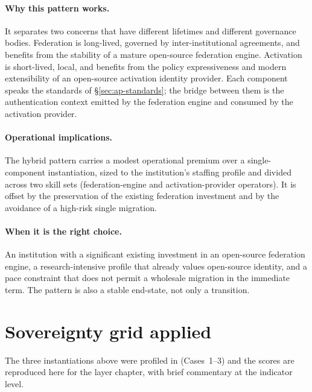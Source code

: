 \paragraph{Why this pattern works.} It separates two concerns that
have different lifetimes and different governance bodies. Federation
is long-lived, governed by inter-institutional agreements, and
benefits from the stability of a mature open-source federation engine.
Activation is short-lived,
local, and benefits from the policy expressiveness and modern
extensibility of an open-source activation identity provider. Each
component speaks the standards of
\S\ref{sec:ap-standards}; the bridge between them is the authentication context emitted
by the federation engine and consumed by the activation provider.

\paragraph{Operational implications.} The hybrid pattern carries a
modest operational premium over a
single-component instantiation, sized to the institution's staffing
profile and divided across two skill sets
(federation-engine and activation-provider operators). It is offset by
the preservation
of the existing federation investment and by the avoidance of a
high-risk single migration.

\paragraph{When it is the right choice.} An institution with a
significant existing investment in an open-source federation engine, a
research-intensive profile that already values open-source identity,
and a pace constraint that does not permit a wholesale migration in
the immediate term. The pattern is also a stable end-state, not only
a transition.

\section{Sovereignty grid applied}
\label{sec:id-sovereignty}

The three instantiations above were profiled in
 (Cases~1--3) and the scores are
reproduced here for the layer chapter, with brief commentary at the
indicator level.

